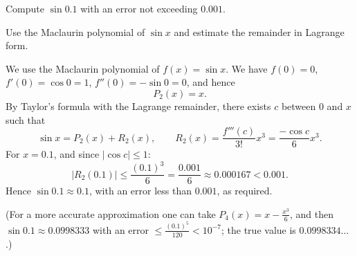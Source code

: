 
\begin{question}
Compute $\sin 0.1$ with an error not exceeding $0.001$.
\end{question}

\begin{hint}
Use the Maclaurin polynomial of $\sin x$ and estimate the remainder in Lagrange form.
\end{hint}

\begin{solution}
We use the Maclaurin polynomial of $f(x)=\sin x$. We have $f(0)=0$, $f'(0)=\cos 0=1$, $f''(0)=-\sin 0=0$, and hence
\[ P_2(x)=x. \]
By Taylor's formula with the Lagrange remainder, there exists $c$ between $0$ and $x$ such that
\[ \sin x=P_2(x)+R_2(x),\qquad R_2(x)=\frac{f'''(c)}{3!}x^3=\frac{-\cos c}{6}x^3. \]
For $x=0.1$, and since $|\cos c|\le 1$:
\[ |R_2(0.1)|\le\frac{(0.1)^3}{6}=\frac{0.001}{6}\approx 0.000167<0.001. \]
Hence $\sin 0.1\approx 0.1$, with an error less than $0.001$, as required.

(For a more accurate approximation one can take $P_4(x)=x-\frac{x^3}{6}$, and then $\sin 0.1\approx 0.0998333$ with an error $\le\frac{(0.1)^5}{120}<10^{-7}$; the true value is $0.0998334\ldots$.)
\end{solution}
